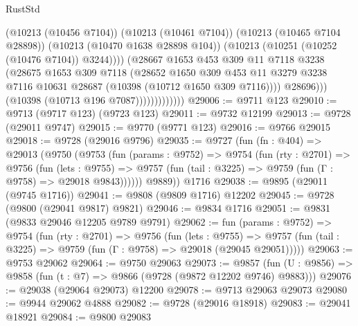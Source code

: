 \begin{lexlean}{RustStd}
\begin{coremodule}
{\begin{coremodule}
{{{{{{{{{{{{{{{{{{{{{{{{{{                                  (@10213 (@10456 @7104))
                                  (@10213 (@10461 @7104))
                                  (@10213 (@10465 @7104 @28898))
                                  (@10213 (@10470 @1638 @28898 @104))
                                  (@10213 (@10251 (@10252 (@10476 @7104)) @3244))))
                              (@28667
                                @1653
                                @453
                                @309
                                @11
                                @7118
                                @3238
                                (@28675
                                  @1653
                                  @309
                                  @7118
                                  (@28652
                                    @1650
                                    @309
                                    @453
                                    @11
                                    @3279
                                    @3238
                                    @7116
                                    @10631
                                    @28687
                                    (@10398 (@10712 @1650 @309 @7116))))
                                @28696)))
                          (@10398 (@10713 @196 @7087)))))))))))))
@29006 := @9711 @123
@29010 := @9713 (@9717 @123) (@9723 @123)
@29011 := @9732 @12199
@29013 := @9728 (@29011 @9747)
@29015 := @9770 (@9771 @123)
@29016 := @9766 @29015
@29018 := @9728 (@29016 @9796)
@29035 := @9727
    (fun (fn : @404) =>
    @29013
      (@9750
        (@9753
          (fun (params : @9752) =>
          @9754
            (fun (rty : @2701) =>
            @9756
              (fun (lets : @9755) =>
              @9757 (fun (tail : @3225) => @9759 (fun (Γ : @9758) => @29018 @9843))))))
        @9889))
    @1716
@29038 := @9895 (@29011 (@9745 @1716))
@29041 := @9808 (@9809 @1716) @12202
@29045 := @9728 (@9800 (@29041 @9817) @9821)
@29046 := @9834 @1716
@29051 := @9831 (@9833 @29046 @12205 @9789 @9791)
@29062 := fun (params : @9752) =>
  @9754
    (fun (rty : @2701) =>
    @9756
      (fun (lets : @9755) =>
      @9757 (fun (tail : @3225) => @9759 (fun (Γ : @9758) => @29018 (@29045 @29051)))))
@29063 := @9753 @29062
@29064 := @9750 @29063
@29073 := @9857
    (fun (U : @9856) => @9858 (fun (t : @7) => @9866 (@9728 (@9872 @12202 @9746) @9883)))
@29076 := @29038 (@29064 @29073) @12200
@29078 := @9713 @29063 @29073
@29080 := @9944 @29062 @4888
@29082 := @9728 (@29016 @18918)
@29083 := @29041 @18921
@29084 := @9800 @29083
}}}}}}}}}}}}}}}}}}}}}}}}}}
\end{coremodule}}
\end{coremodule}
\end{lexlean}
